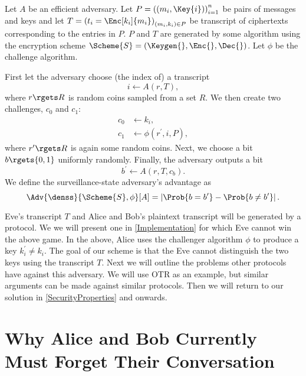 \begin{definition}\label{DEN-SS}
  Let \(A\) be an efficient adversary.
  Let \(P = \left( (m_i, \Key{i}) \right)_{i=1}^{n}\) be pairs of messages and 
  keys and let \(T = \left( t_i = \Enc[k_i]{ m_i } \right)_{(m_i, k_i)\in P}\) 
  be transcript of ciphertexts corresponding to the entries in \(P\).
  \(P\) and \(T\) are generated by some algorithm using the encryption scheme 
  \(\Scheme{S} = (\Keygen{}, \Enc{}, \Dec{})\).
  Let \(\phi\) be the challenge algorithm.

  First let the adversary choose (the index of) a transcript \[
    i\gets A( r, T ),
  \] where \(r\rgets R\) is random coins sampled from a set \(R\).
  We then create two challenges, \(c_0\) and \(c_1\):
  \begin{align*}
    c_0 &\gets k_i, \\
    c_1 &\gets \phi( r^\prime, i, P ),
  \end{align*}
  where \(r^\prime\rgets R\) is again some random coins.
  Next, we choose a bit \(b\rgets \{0, 1\}\) uniformly randomly.
  Finally, the adversary outputs a bit \[
    b^\prime\gets A( r, T, c_b ).
  \]
  We define the surveillance-state adversary's advantage as
  \begin{equation}\label{DEN-SSAdvantage}
    \Adv{\denss}{\Scheme{S}, \phi}[A] =
      \left|\Prob{b = b^\prime} - \Prob{b\neq b^\prime}\right|.
  \end{equation}
\end{definition}

Eve's transcript \(T\) and Alice and Bob's plaintext transcript will be 
generated by a protocol.
We we will present one in \cref{Implementation} for which Eve cannot 
win the above game.
In the above, Alice uses the challenger algorithm \(\phi\) to produce a key 
\(k_i^\prime\neq k_i\).
The goal of our scheme is that the Eve cannot distinguish the two keys using 
the transcript \(T\).
Next we will outline the problems other protocols have against this adversary.
We will use \ac{OTR} as an example, but similar arguments can be made against 
similar protocols.
Then we will return to our solution in \cref{SecurityProperties} and onwards.


\section{Why Alice and Bob Currently Must Forget Their Conversation}
\label{Undeniability}

